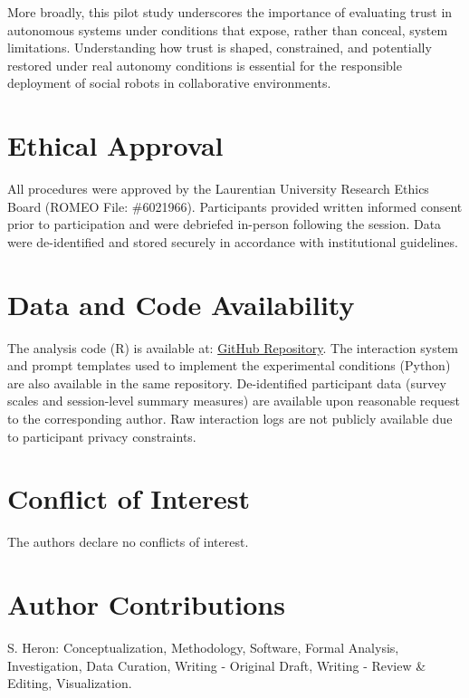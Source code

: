\documentclass[
]{article}
\begin{document}
More broadly, this pilot study underscores the importance of evaluating
trust in autonomous systems under conditions that expose, rather than
conceal, system limitations. Understanding how trust is shaped,
constrained, and potentially restored under real autonomy conditions is
essential for the responsible deployment of social robots in
collaborative environments.

\section{Ethical Approval}\label{ethical-approval}

All procedures were approved by the Laurentian University Research
Ethics Board (ROMEO File: \#6021966). Participants provided written
informed consent prior to participation and were debriefed in-person
following the session. Data were de-identified and stored securely in
accordance with institutional guidelines.

\section{Data and Code Availability}\label{data-and-code-availability}

The analysis code (R) is available at:
\href{https://github.com/shaunaheron2/misty-paper}{GitHub Repository}.
The interaction system and prompt templates used to implement the
experimental conditions (Python) are also available in the same
repository. De-identified participant data (survey scales and
session-level summary measures) are available upon reasonable request to
the corresponding author. Raw interaction logs are not publicly
available due to participant privacy constraints.

\section{Conflict of Interest}\label{conflict-of-interest}

The authors declare no conflicts of interest.

\section{Author Contributions}\label{author-contributions}

S. Heron: Conceptualization, Methodology, Software, Formal Analysis,
Investigation, Data Curation, Writing - Original Draft, Writing - Review
\& Editing, Visualization.
\end{document}
